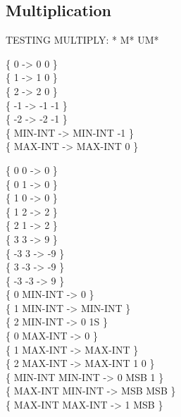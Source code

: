 \subsection{Multiplication}

\begin{tt}
TESTING MULTIPLY:  * M* UM*

\{       0  ->       0  0 \} \\
\{       1  ->       1  0 \} \\
\{       2  ->       2  0 \} \\
\{      -1  ->      -1 -1 \} \\
\{      -2  ->      -2 -1 \} \\
\{ MIN-INT  -> MIN-INT -1 \} \\
\{ MAX-INT  -> MAX-INT  0 \}

\{       0       0  ->       0  \} \\
\{       0       1  ->       0  \} \\
\{       1       0  ->       0  \} \\
\{       1       2  ->       2  \} \\
\{       2       1  ->       2  \} \\
\{       3       3  ->       9  \} \\
\{      -3       3  ->      -9  \} \\
\{       3      -3  ->      -9  \} \\
\{      -3      -3  ->       9  \} \\
\{       0 MIN-INT  ->       0  \} \\
\{       1 MIN-INT  -> MIN-INT  \} \\
\{       2 MIN-INT  ->       0          1S \} \\
\{       0 MAX-INT  ->       0  \} \\
\{       1 MAX-INT  -> MAX-INT  \} \\
\{       2 MAX-INT  -> MAX-INT     1  0 \} \\
\{ MIN-INT MIN-INT  ->       0 MSB 1    \} \\
\{ MAX-INT MIN-INT  ->     MSB MSB  \} \\
\{ MAX-INT MAX-INT  ->       1 MSB   \}


\end{tt}
